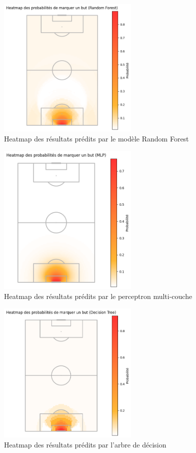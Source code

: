 \documentclass[12pt]{article}
\begin{document}
\begin{figure}[htp]
    \centering
    \includegraphics[width=0.6\textwidth]{img/pitch_visualisation_random_forest.png}
    \caption{Heatmap des résultats prédits par le modèle Random Forest}
    \label{fig:result_random_forest}
\end{figure}

\begin{figure}[htp]
    \centering
    \includegraphics[width=0.6\textwidth]{img/pitch_visualisation_mlp.png}
    \caption{Heatmap des résultats prédits par le perceptron multi-couche}
    \label{fig:result_mlp}
\end{figure}

\begin{figure}[htp]
    \centering
    \includegraphics[width=0.6\textwidth]{img/pitch_visualisation_tree.png}
    \caption{Heatmap des résultats prédits par l'arbre de décision}
    \label{fig:result_tree}
\end{figure}
\end{document}
